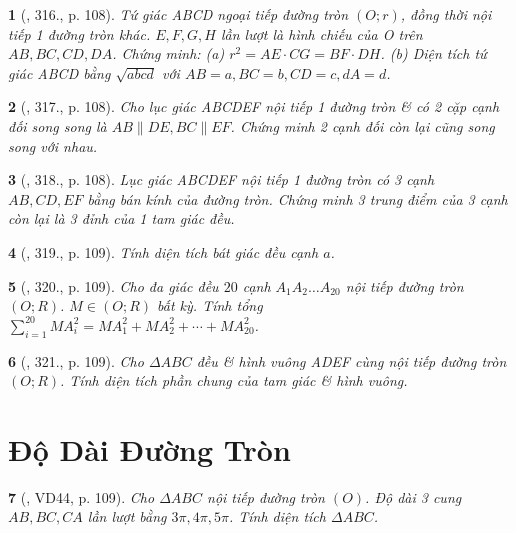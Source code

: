 \documentclass{article}
\newtheorem{baitoan}{}
\begin{document}
\begin{baitoan}[\cite{Binh_Toan_9_tap_2}, 316., p. 108]
	Tứ giác ABCD ngoại tiếp đường tròn $(O;r)$, đồng thời nội tiếp 1 đường tròn khác. $E,F,G,H$ lần lượt là hình chiếu của O trên $AB,BC,CD,DA$. Chứng minh: (a) $r^2 = AE\cdot CG = BF\cdot DH$. (b) Diện tích tứ giác ABCD bằng $\sqrt{abcd}$ với $AB = a,BC = b,CD = c,dA = d$.
\end{baitoan}

\begin{baitoan}[\cite{Binh_Toan_9_tap_2}, 317., p. 108]
	Cho lục giác ABCDEF nội tiếp 1 đường tròn \& có 2 cặp cạnh đối song song là $AB\parallel DE,BC\parallel EF$. Chứng minh 2 cạnh đối còn lại cũng song song với nhau.
\end{baitoan}

\begin{baitoan}[\cite{Binh_Toan_9_tap_2}, 318., p. 108]
	Lục giác ABCDEF nội tiếp 1 đường tròn có 3 cạnh $AB,CD,EF$ bằng bán kính của đường tròn. Chứng minh 3 trung điểm của 3 cạnh còn lại là 3 đỉnh của 1 tam giác đều.
\end{baitoan}

\begin{baitoan}[\cite{Binh_Toan_9_tap_2}, 319., p. 109]
	Tính diện tích bát giác đều cạnh $a$.
\end{baitoan}

\begin{baitoan}[\cite{Binh_Toan_9_tap_2}, 320., p. 109]
	Cho đa giác đều $20$ cạnh $A_1A_2\ldots A_{20}$ nội tiếp đường tròn $(O;R)$. $M\in(O;R)$ bất kỳ. Tính tổng $\sum_{i=1}^{20} MA_i^2 = MA_1^2 + MA_2^2 + \cdots + MA_{20}^2$.
\end{baitoan}

\begin{baitoan}[\cite{Binh_Toan_9_tap_2}, 321., p. 109]
	Cho $\Delta ABC$ đều \& hình vuông ADEF cùng nội tiếp đường tròn $(O;R)$. Tính diện tích phần chung của tam giác \& hình vuông.
\end{baitoan}


\section{Độ Dài Đường Tròn}

\begin{baitoan}[\cite{Binh_Toan_9_tap_2}, VD44, p. 109]
	Cho $\Delta ABC$ nội tiếp đường tròn $(O)$. Độ dài 3 cung $AB,BC,CA$ lần lượt bằng $3\pi,4\pi,5\pi$. Tính diện tích $\Delta ABC$.
\end{baitoan}
\end{document}
